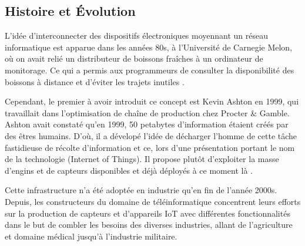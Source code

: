 \subsection{Histoire et Évolution}
L'idée d'interconnecter des dispositifs électroniques moyennant un réseau informatique est apparue dans les années 80s, à l'Université de Carnegie Melon, où on avait relié un distributeur de boissons fraîches à un ordinateur de monitorage. Ce qui a permis aux programmeurs de consulter la disponibilité des boissons à distance et d'éviter les trajets inutiles \cite{madakam2015}.\par
Cependant, le premier à avoir introduit ce concept est Kevin Ashton en 1999, qui travaillait dans l'optimisation de chaîne de production chez Procter \& Gamble. Ashton avait constaté qu'en 1999, 50 petabytes d'information étaient créés par des êtres humains. D'où, il a dévelopé l'idée de décharger l'homme de cette tâche fastidieuse de récolte d'information et ce, lors d'une présentation portant le nom de la technologie (Internet of Things). Il propose plutôt d'exploiter la masse d'engins et de capteurs disponibles et déjà déployés à ce moment là \cite{ashton2009}.\par
Cette infrastructure n'a été adoptée en industrie qu'en fin de l'année 2000s. Depuis, les constructeurs du domaine de téléinformatique concentrent leurs efforts sur la production de capteurs et d'appareils IoT avec différentes fonctionnalités dans le but de combler les besoins des diverses industries, allant de l'agriculture et domaine médical jusqu'à l'industrie militaire.

